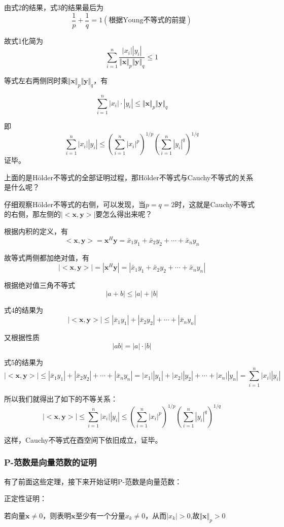 \documentclass[12pt, a4paper, oneside, UTF8]{ctexbook}
\begin{document}
由式2的结果，式3的结果最后为
\[
\frac{1}{p}+\frac{1}{q}=1(\text{根据Young不等式的前提})
\]

故式1化简为
\[
\sum\limits_{i=1}^n\frac{|x_i||y_i|}{\Vert \boldsymbol{x}\Vert_p \Vert \boldsymbol{y}\Vert_q}\leq 1
\]

等式左右两侧同时乘$\Vert \boldsymbol{x}\Vert_p \Vert \boldsymbol{y}\Vert_q$，有

\[
\sum\limits_{i=1}^n|x_i|\cdot|y_i|\leq \Vert \boldsymbol{x}\Vert_p \Vert \boldsymbol{y}\Vert_q
\]

即
\[
\sum\limits_{i=1}^n|x_i||y_i|\leq(\sum\limits_{i=1}^n|x_i|^p)^{1/p}(\sum\limits_{i=1}^n|y_i|^q)^{1/q}
\]
证毕。

上面的是Hölder不等式的全部证明过程，那Hölder不等式与Cauchy不等式的关系是什么呢？

仔细观察Hölder不等式的右侧，可以发现，当$p=q=2$时，这就是Cauchy不等式的右侧，那左侧的$|<\boldsymbol{x,y}>|$要怎么得出来呢？

根据内积的定义，有\[
<\boldsymbol{x,y}>=\boldsymbol{x}^H\boldsymbol{y}=\bar{x}_1y_1+\bar{x}_2y_2+\cdots+\bar{x}_ny_n
\]

故等式两侧都加绝对值，有\[
|<\boldsymbol{x,y}>|=|\boldsymbol{x}^H\boldsymbol{y}|=|\bar{x}_1y_1+\bar{x}_2y_2+\cdots+\bar{x}_ny_n|\tag{4}
\]

根据绝对值三角不等式\[
|a+b|\leq|a|+|b|
\]

式4的结果为\[
|<\boldsymbol{x,y}>|\leq |\bar{x}_1y_1|+|\bar{x}_2y_2|+\cdots+|\bar{x}_ny_n|\tag{5}
\]

又根据性质\[|ab|=|a|\cdot|b|\]

式5的结果为\[
|<\boldsymbol{x,y}>|\leq |\bar{x}_1y_1|+|\bar{x}_2y_2|+\cdots+|\bar{x}_ny_n|=|x_1||y_1|+|x_2||y_2|+\cdots+|x_n||y_n|=\sum\limits_{i=1}^n|x_i||y_i|\tag{5}
\]

所以我们就得出了如下的不等关系：
\[
|<\boldsymbol{x,y}>|\leq\sum\limits_{i=1}^n|x_i||y_i|\leq(\sum\limits_{i=1}^n|x_i|^p)^{1/p}(\sum\limits_{i=1}^n|y_i|^q)^{1/q}
\]

这样，Cauchy不等式在酉空间下依旧成立，证毕。
\subsubsection{P-范数是向量范数的证明}
有了前面这些定理，接下来开始证明P-范数是向量范数：

\noindent
正定性证明：

若向量$\boldsymbol{x}\neq 0$，则表明$\boldsymbol{x}$至少有一个分量$x_k\neq 0$，从而$|x_k|>0$,故$\Vert \boldsymbol{x}\Vert_p>0$
\end{document}
